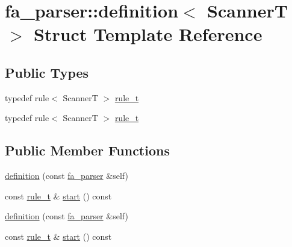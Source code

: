 \hypertarget{structfa__parser_1_1definition}{\section{fa\+\_\+parser\+:\+:definition$<$ Scanner\+T $>$ Struct Template Reference}
\label{structfa__parser_1_1definition}
}
\subsection*{Public Types}
\begin{DoxyCompactItemize}
\item 
typedef rule$<$ Scanner\+T $>$ \hyperlink{structfa__parser_1_1definition_afa348afda38b7917e6a6b9ab5bf954fd}{rule\+\_\+t}
\item 
typedef rule$<$ Scanner\+T $>$ \hyperlink{structfa__parser_1_1definition_afa348afda38b7917e6a6b9ab5bf954fd}{rule\+\_\+t}
\end{DoxyCompactItemize}
\subsection*{Public Member Functions}
\begin{DoxyCompactItemize}
\item 
\hyperlink{structfa__parser_1_1definition_a3544f30ad4e49e5192dd23b9b5ed2f23}{definition} (const \hyperlink{structfa__parser}{fa\+\_\+parser} \&self)
\item 
const \hyperlink{structfa__parser_1_1definition_afa348afda38b7917e6a6b9ab5bf954fd}{rule\+\_\+t} \& \hyperlink{structfa__parser_1_1definition_a87d6df44de6e53bd59fb0366d4e2d864}{start} () const 
\item 
\hyperlink{structfa__parser_1_1definition_a3544f30ad4e49e5192dd23b9b5ed2f23}{definition} (const \hyperlink{structfa__parser}{fa\+\_\+parser} \&self)
\item 
const \hyperlink{structfa__parser_1_1definition_afa348afda38b7917e6a6b9ab5bf954fd}{rule\+\_\+t} \& \hyperlink{structfa__parser_1_1definition_a87d6df44de6e53bd59fb0366d4e2d864}{start} () const 
\end{DoxyCompactItemize}
